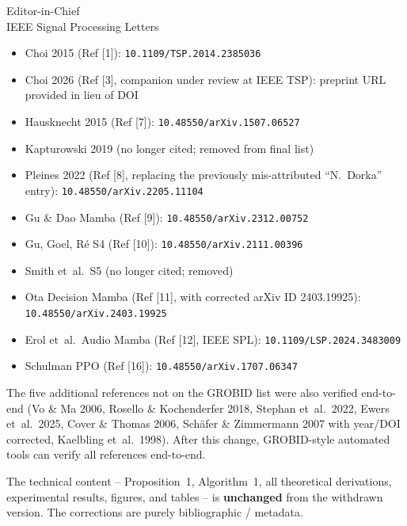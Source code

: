 \documentclass[11pt,a4paper]{letter}
\begin{document}
\begin{letter}{Editor-in-Chief\\
IEEE Signal Processing Letters}
\smallskip
\begin{itemize}\itemsep0pt\parskip0pt\small
  \item Choi 2015 (Ref [1]): \texttt{10.1109/TSP.2014.2385036}
  \item Choi 2026 (Ref [3], companion under review at IEEE TSP):
        preprint URL provided in lieu of DOI
  \item Hausknecht 2015 (Ref [7]):
        \texttt{10.48550/arXiv.1507.06527}
  \item Kapturowski 2019 (no longer cited; removed from final list)
  \item Pleines 2022 (Ref [8], replacing the previously mis-attributed
        ``N.~Dorka'' entry): \texttt{10.48550/arXiv.2205.11104}
  \item Gu \& Dao Mamba (Ref [9]):
        \texttt{10.48550/arXiv.2312.00752}
  \item Gu, Goel, R\'e S4 (Ref [10]):
        \texttt{10.48550/arXiv.2111.00396}
  \item Smith et~al.\ S5 (no longer cited; removed)
  \item Ota Decision Mamba (Ref [11], with corrected arXiv ID
        2403.19925): \texttt{10.48550/arXiv.2403.19925}
  \item Erol et~al.\ Audio Mamba (Ref [12], IEEE SPL):
        \texttt{10.1109/LSP.2024.3483009}
  \item Schulman PPO (Ref [16]):
        \texttt{10.48550/arXiv.1707.06347}
\end{itemize}

\smallskip
The five additional references not on the GROBID list were also
verified end-to-end (Vo \& Ma 2006, Rosello \& Kochenderfer 2018,
Stephan et~al.\ 2022, Ewers et~al.\ 2025, Cover \& Thomas 2006,
Sch\"afer \& Zimmermann 2007 with year/DOI corrected, Kaelbling
et~al.\ 1998). After this change, GROBID-style automated tools can
verify all references end-to-end.

The technical content -- Proposition~1, Algorithm~1, all theoretical
derivations, experimental results, figures, and tables -- is
\textbf{unchanged} from the withdrawn version. The corrections are
purely bibliographic / metadata.


\end{letter}
\end{document}
